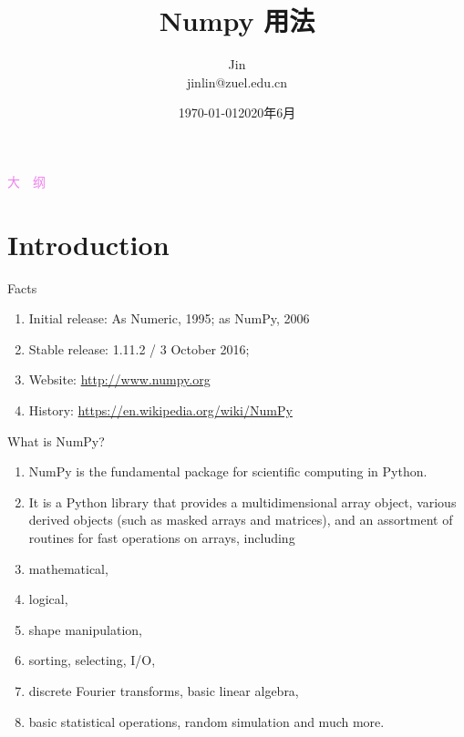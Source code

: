 \documentclass[ignorenonframetext,11pt,xcolor=dvipsnames,hyperref={colorlinks,allcolors=.,urlcolor=blue, citecolor=violet, bookmarksdepth=4},aspectratio=1610]{beamer}
\author[Jin]{\CJKfamily{kai}Jin \\ jinlin@zuel.edu.cn \\}
\institute[中南财经政法大学统计与数学学院]{\normalsize\CJKfamily{kai}中南财经政法大学统计与数学学院}
\date{\today}
\date{2020年6月}
\title{Numpy 用法}
\providecommand{\tightlist}{%
  \setlength{\itemsep}{0pt}\setlength{\parskip}{0pt}}
\begin{document}
\frame{\titlepage}

\begin{frame}{\textcolor{violet}{\normalfont\Large {}大\ \ 纲 }} \textcolor{violet}{}
\tableofcontents[hideallsubsections]
\end{frame}

\hypertarget{introduction}{%
\section{Introduction}\label{introduction}}

\begin{frame}{Facts}
\protect\hypertarget{facts}{}

\begin{enumerate}
\tightlist
\item
  Initial release: As Numeric, 1995; as NumPy, 2006
\item
  Stable release: 1.11.2 / 3 October 2016;
\item
  Website: \url{http://www.numpy.org}
\item
  History: \url{https://en.wikipedia.org/wiki/NumPy}
\end{enumerate}

\end{frame}

\begin{frame}{What is NumPy?}
\protect\hypertarget{what-is-numpy}{}

\begin{enumerate}
\item
  NumPy is the fundamental package for scientific computing in Python.
\item
  It is a Python library that provides a multidimensional array object,
  various derived objects (such as masked arrays and matrices), and an
  assortment of routines for fast operations on arrays, including
\item
  mathematical,
\item
  logical,
\item
  shape manipulation,
\item
  sorting, selecting, I/O,
\item
  discrete Fourier transforms, basic linear algebra,
\item
  basic statistical operations, random simulation and much more.
\end{enumerate}

\end{frame}
\end{document}
